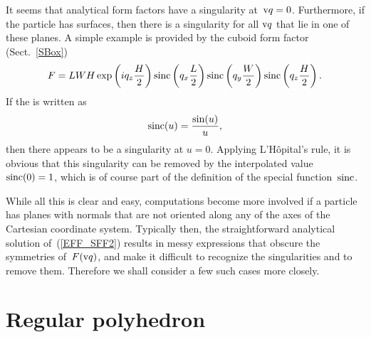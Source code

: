%
It seems that  analytical form factors have a singularity at~$\text{v}{q}=0$.
Furthermore, if the particle has  surfaces,
then there is a singularity for all $\text{v}{q}$ that lie in one of these planes.
A simple example is provided by the cuboid form factor (Sect.~\ref{SBox})
\begin{equation}
F= L W H\exp\left(i q_z \frac{H}{2}\right) \operatorname{sinc}\left(q_x \frac{L}{2}\right)
\operatorname{sinc}\left(q_y \frac{W}{2}\right) \operatorname{sinc}\left(q_z \frac{H}{2}\right).
\end{equation}
If the  is written as
\begin{equation}
  \operatorname{sinc}(u) = \frac{\sin(u)}{u},
\end{equation}
then there appears to be a singularity at $u=0$.
Applying L'Hôpital's rule, it is obvious
that this singularity can be removed by the interpolated value
$\operatorname{sinc}(0)=1$,
which is of course part of the definition of the special function~$\operatorname{sinc}$.

While all this is clear and easy,
computations become more involved
if a particle has planes with normals that are not oriented along
any of the axes of the Cartesian coordinate system.
Typically then, the straightforward analytical solution of~(\ref{EFF_SFF2})
results in messy expressions that obscure the symmetries of~$F(\text{v}{q})$,
and make it difficult to recognize the singularities and
to remove them.
Therefore we shall consider a few such cases more closely.


\section{Regular polyhedron}

\def\tqx{\alpha} %
\def\tqy{\beta}  %

